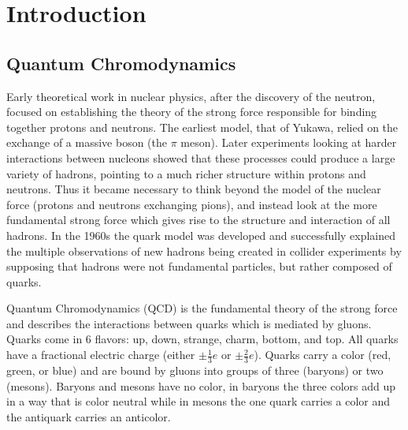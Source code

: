 \chapter{Introduction}

\section{Quantum Chromodynamics}

Early theoretical work in nuclear physics, after the discovery of the neutron, focused on establishing the theory of the strong force responsible for binding together protons and neutrons. The earliest model, that of Yukawa, relied on the exchange of a massive boson (the $\pi$ meson). Later experiments looking at harder interactions between nucleons showed that these processes could produce a large variety of hadrons, pointing to a much richer structure within protons and neutrons. Thus it became necessary to think beyond the model of the nuclear force (protons and neutrons exchanging pions), and instead look at the more fundamental strong force which gives rise to the structure and interaction of all hadrons. In the 1960s the quark model was developed and successfully explained the multiple observations of new hadrons being created in collider experiments by supposing that hadrons were not fundamental particles, but rather composed of quarks.

Quantum Chromodynamics (QCD) is the fundamental theory of the strong force and describes the interactions between quarks which is mediated by gluons. Quarks come in 6 flavors: up, down, strange, charm, bottom, and top. All quarks have a fractional electric charge (either $\pm \frac{1}{3}e$ or $\pm \frac{2}{3}e$). Quarks carry a color (red, green, or blue) and are bound by gluons into groups of three (baryons) or two (mesons). Baryons and mesons have no color, in baryons the three colors add up in a way that is color neutral while in mesons the one quark carries a color and the antiquark carries an anticolor. 

